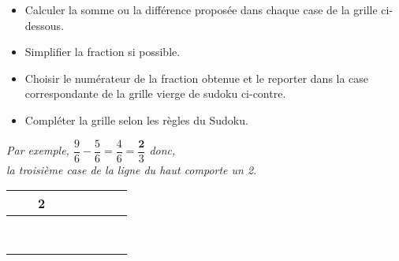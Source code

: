 \enigme[Sudofractions]
   \begin{minipage}{7.5cm}
      \begin{itemize}
         \item Calculer la somme ou la différence proposée dans chaque case de la grille ci-dessous.
         \item Simplifier la fraction si possible.
         \item Choisir le numérateur de la fraction obtenue et le reporter dans la case correspondante de la grille vierge de sudoku ci-contre.
         \item Compléter la grille selon les règles du Sudoku.
      \end{itemize}
      {\it Par exemple, $\dfrac96-\dfrac56 =\dfrac46 =\dfrac{\textbf{2}}{3}$ donc, \\ [1mm]
         la troisième case de la ligne du haut comporte un 2}.
   \end{minipage}
   \qquad
   \begin{minipage}{7cm}
   {
      \begin{tabular}{|*{3}{C{0.5}|}|*{3}{C{0.5}|}|*{3}{C{0.5}|}}
         \hline
         & & {\bf 2} & & & & & & \\
         \hline
         & & & & & & & & \\
         \hline
         & & & & & & & & \\
         \hline
         \hline
         & & & & & & & & \\
         \hline
         & & & & & & & & \\
         \hline
         & & & & & & & & \\
         \hline
         \hline
         & & & & & & & & \\
         \hline
         & & & & & & & & \\
         \hline
         & & & & & & & & \\
         \hline
      \end{tabular}}
   \end{minipage}
  \vfill
